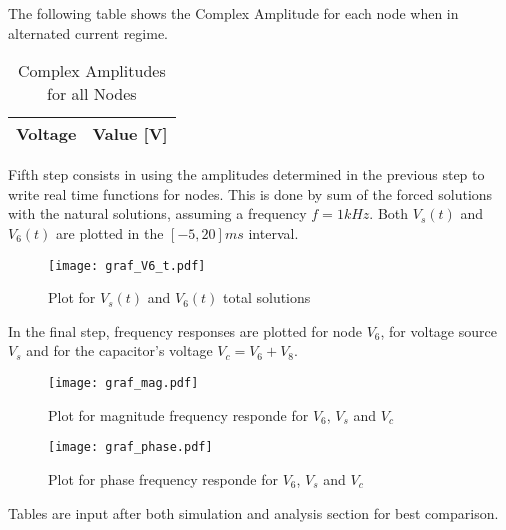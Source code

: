 \par
\par
The following table shows the Complex Amplitude for each node when in alternated current regime.
\par
\par
\begin{table}[H]
  \centering
  \begin{tabular}{|l|r|}
    \hline    
    {\bf Voltage} & {\bf Value [V]} \\ \hline
    
  \end{tabular}
  \caption{Complex Amplitudes for all Nodes}
  \label{tab:tcamp}
\end{table}

Fifth step consists in using the amplitudes determined in the previous step to write real time functions for nodes. This is done by sum of the forced solutions with the natural solutions, assuming a frequency $f=1kHz$. Both $V_s(t)$ and $V_6(t)$ are plotted in the $[-5, 20]ms$ interval.
\begin{figure}[H] \centering
\texttt{[image: graf\_V6\_t.pdf]}
\caption{Plot for $V_s(t)$ and $V_6(t)$ total solutions}
\end{figure}

In the final step, frequency responses are plotted for node $V_6$, for voltage source $V_s$ and for the capacitor's voltage $V_c=V_6+V_8$. 
\begin{figure}[H] \centering
\texttt{[image: graf\_mag.pdf]}
\caption{Plot for magnitude frequency responde for $V_6$, $V_s$ and $V_c$}
\end{figure}
\begin{figure}[H] \centering
\texttt{[image: graf\_phase.pdf]}
\caption{Plot for phase frequency responde for $V_6$, $V_s$ and $V_c$}
\end{figure}
Tables are input after both simulation and analysis section for best comparison.
